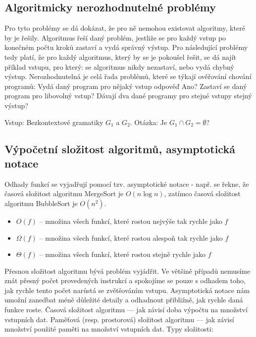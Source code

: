 \subsection{Algoritmicky nerozhodnutelné problémy}
Pro tyto problémy se dá dokázat, že pro ně nemohou existovat algoritmy, které by je řešily. Algoritmus řeší daný problém, jestliže se pro každý 
vstup po konečném počtu kroků zastaví a vydá správný výstup. Pro následující problémy tedy platí, že pro každý algoritmus, který by se je pokoušel řešit, se dá najít příklad vstupu, pro který: se algoritmus nikdy nezastaví, nebo vydá chybný výstup. Nerozhodnutelná je celá řada problémů, které se týkají ověřování chování programů: Vydá daný program pro nějaký vstup odpověď Ano? Zastaví se daný program pro libovolný vstup? Dávají dva dané programy pro stejné vstupy stejný výstup?

Vstup: Bezkontextové gramatiky $G_1$ a $G_2$.
Otázka: Je $G_1 \cap G_2 = \emptyset$?

\subsection{Výpočetní složitost algoritmů, asymptotická notace}
Odhady funkcí se vyjadřují pomocí tzv. asymptotické notace - např. se řekne, že časová složitost algoritmu MergeSort je $O(n \log n)$,
 zatímco časová složitost algoritmu BubbleSort je $O(n^2)$.
\begin{itemize}
\item $O(f)$ -- množina všech funkcí, které rostou nejvýše tak rychle jako $f$
\item $\Omega(f)$ -- množina všech funkcí, které rostou alespoň tak rychle jako $f$
\item $\Theta(f)$ -- množina všech funkcí, které rostou stejně rychle jako $f$
\end{itemize}

Přesnou složitost algoritmu bývá problém vyjádřit. Ve většině případů nemusíme znát přesný počet provedených instrukcí a spokojíme se pouze s odhadem toho, jak rychle tento počet narůstá se zvětšováním vstupu. Asymptotická notace nám umožní zanedbat méně důležité detaily a odhadnout přibližně, jak rychle daná funkce roste.  Časová složitost algoritmu — jak závisí doba výpočtu na množství vstupních dat. Paměťová (resp. prostorová) složitost algoritmu — jak závisí množství použité paměti na množství vstupních dat. Typy složitosti:

